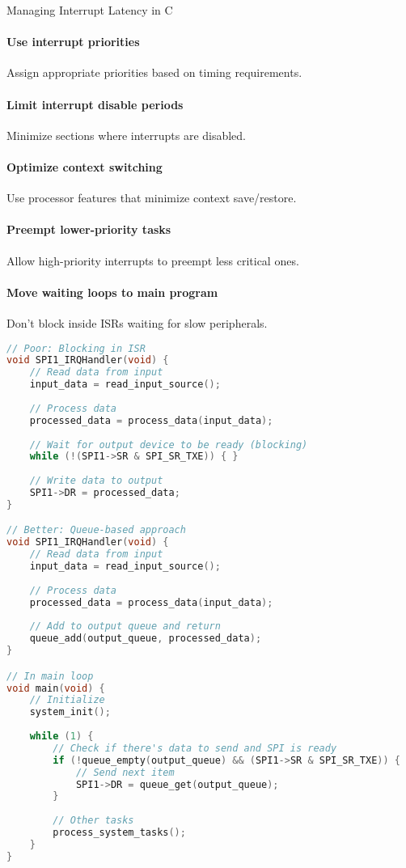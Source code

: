 \begin{KR}{Managing Interrupt Latency in C}
\paragraph{Use interrupt priorities}
Assign appropriate priorities based on timing requirements.
\paragraph{Limit interrupt disable periods}
Minimize sections where interrupts are disabled.
\paragraph{Optimize context switching}
Use processor features that minimize context save/restore.
\paragraph{Preempt lower-priority tasks}
Allow high-priority interrupts to preempt less critical ones.
\paragraph{Move waiting loops to main program}
Don't block inside ISRs waiting for slow peripherals.

\begin{lstlisting}[language=C, style=basesmol]
// Poor: Blocking in ISR
void SPI1_IRQHandler(void) {
    // Read data from input
    input_data = read_input_source();
    
    // Process data
    processed_data = process_data(input_data);
    
    // Wait for output device to be ready (blocking)
    while (!(SPI1->SR & SPI_SR_TXE)) { }
    
    // Write data to output
    SPI1->DR = processed_data;
}

// Better: Queue-based approach
void SPI1_IRQHandler(void) {
    // Read data from input
    input_data = read_input_source();
    
    // Process data
    processed_data = process_data(input_data);
    
    // Add to output queue and return
    queue_add(output_queue, processed_data);
}

// In main loop
void main(void) {
    // Initialize
    system_init();
    
    while (1) {
        // Check if there's data to send and SPI is ready
        if (!queue_empty(output_queue) && (SPI1->SR & SPI_SR_TXE)) {
            // Send next item
            SPI1->DR = queue_get(output_queue);
        }
        
        // Other tasks
        process_system_tasks();
    }
}
\end{lstlisting}
\end{KR}

